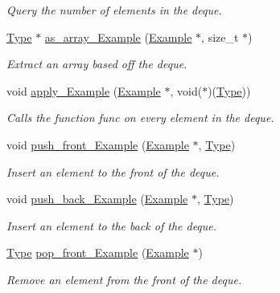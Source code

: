\begin{DoxyCompactItemize}
\begin{DoxyCompactList}\small\item\em Query the number of elements in the deque. \end{DoxyCompactList}\item 
\hyperlink{group__DEQUE_gac9c83c2070eb6b5891cf742b90f54c68}{Type} $\ast$ \hyperlink{group__DEQUE_ga0214e3a819ca3e1ec44d2f60d7c28f7b}{as\+\_\+array\+\_\+\+Example} (\hyperlink{structExample}{Example} $\ast$, size\+\_\+t $\ast$)
\begin{DoxyCompactList}\small\item\em Extract an array based off the deque. \end{DoxyCompactList}\item 
void \hyperlink{group__DEQUE_ga582c40f070af171e4c98455d7d6fd305}{apply\+\_\+\+Example} (\hyperlink{structExample}{Example} $\ast$, void($\ast$)(\hyperlink{group__DEQUE_gac9c83c2070eb6b5891cf742b90f54c68}{Type}))
\begin{DoxyCompactList}\small\item\em Calls the function func on every element in the deque. \end{DoxyCompactList}\item 
void \hyperlink{group__DEQUE_ga7ef7f1f62eb4aa5565c04013ac376433}{push\+\_\+front\+\_\+\+Example} (\hyperlink{structExample}{Example} $\ast$, \hyperlink{group__DEQUE_gac9c83c2070eb6b5891cf742b90f54c68}{Type})
\begin{DoxyCompactList}\small\item\em Insert an element to the front of the deque. \end{DoxyCompactList}\item 
void \hyperlink{group__DEQUE_ga63a0566b60e881121b5ba029a25cb9ae}{push\+\_\+back\+\_\+\+Example} (\hyperlink{structExample}{Example} $\ast$, \hyperlink{group__DEQUE_gac9c83c2070eb6b5891cf742b90f54c68}{Type})
\begin{DoxyCompactList}\small\item\em Insert an element to the back of the deque. \end{DoxyCompactList}\item 
\hyperlink{group__DEQUE_gac9c83c2070eb6b5891cf742b90f54c68}{Type} \hyperlink{group__DEQUE_ga9fe851644b8743ed3e189e2b7872641a}{pop\+\_\+front\+\_\+\+Example} (\hyperlink{structExample}{Example} $\ast$)
\begin{DoxyCompactList}\small\item\em Remove an element from the front of the deque. \end{DoxyCompactList}\item 

\end{DoxyCompactItemize}
